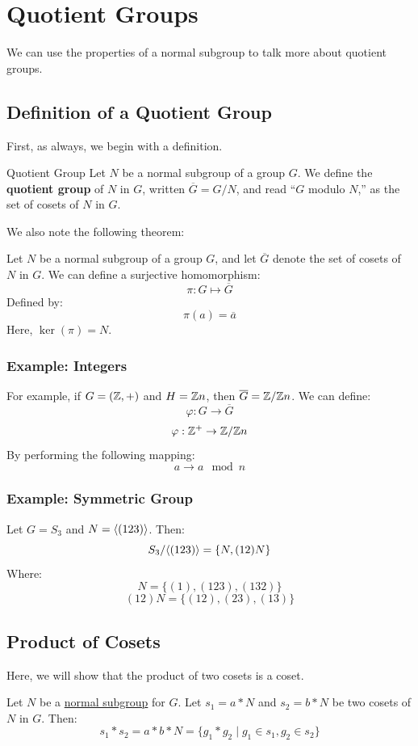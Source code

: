 \documentclass[letterpaper]{article}
\begin{document}
\newpage 
\section{Quotient Groups}
We can use the properties of a normal subgroup to talk more about quotient groups. 

\subsection{Definition of a Quotient Group}
First, as always, we begin with a definition. 
\begin{definition}{Quotient Group}{}
    Let $N$ be a normal subgroup of a group $G$. We define the \textbf{quotient group} of $N$ in $G$, written $\overline{G} = G/N$, and read ``$G$ modulo $N$,'' as the set of cosets of $N$ in $G$. 
\end{definition}

We also note the following theorem: 
\begin{theorem}{}{}
    Let $N$ be a normal subgroup of a group $G$, and let $\overline{G}$ denote the set of cosets of $N$ in $G$. We can define a surjective homomorphism: 
    \[\pi: G \mapsto \overline{G}\]
    Defined by: 
    \[\pi(a) = \overline{a}\]
    Here, $\ker(\pi) = N$. 
\end{theorem}

\subsubsection{Example: Integers}
For example, if $G = (\mathbb{Z}, +)$ and $H = \mathbb{Z} n$, then $\overline{G} = \mathbb{Z} / \mathbb{Z} n$. We can define: 
\[\varphi: G \to \overline{G}\]
\[\varphi: \mathbb{Z}^+ \to \mathbb{Z} / \mathbb{Z} n\]
By performing the following mapping: 
\[a \to a \mod{n}\]

\subsubsection{Example: Symmetric Group}
Let $G = S_3$ and $N = \langle (123) \rangle$. Then: 
\[S_3 / \langle (123) \rangle = \{N, (12)N\}\]
Where: 
\[N = \{(1), (123), (132)\}\]
\[(12)N = \{(12), (23), (13)\}\]


\subsection{Product of Cosets}
Here, we will show that the product of two cosets is a coset. 
\begin{lemma}{}{}
    Let $N$ be a \underline{normal subgroup} for $G$. Let $s_1 = a * N$ and $s_2 = b * N$ be two cosets of $N$ in $G$. Then: 
    \[s_1 * s_2 = \boxed{a * b * N} = \{g_1 * g_2 \mid g_1 \in s_1, g_2 \in s_2\}\]
\end{lemma}
\end{document}
